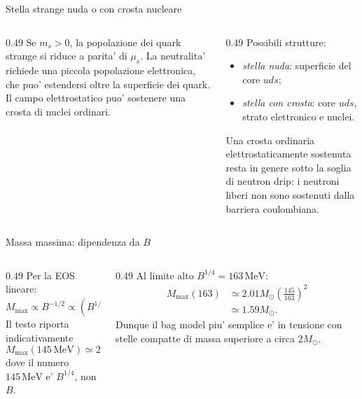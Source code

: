 \begin{frame}{Stella strange nuda o con crosta nucleare}
\small
\begin{columns}[T,onlytextwidth]
\begin{column}{0.49\textwidth}
Se $m_s>0$, la popolazione dei quark
strange si riduce a parita' di $\mu_s$.
\medskip
La neutralita' richiede una piccola
popolazione elettronica, che puo'
estendersi oltre la superficie dei quark.
\medskip
Il campo elettrostatico puo' sostenere
una crosta di nuclei ordinari.
\end{column}
\begin{column}{0.49\textwidth}
Possibili strutture:
\begin{itemize}
\item \emph{stella nuda}: superficie del core $uds$;
\item \emph{stella con crosta}: core $uds$,
strato elettronico e nuclei.
\end{itemize}
Una crosta ordinaria elettrostaticamente
sostenuta resta in genere sotto
la soglia di neutron drip: i neutroni
liberi non sono sostenuti dalla
barriera coulombiana.
\end{column}
\end{columns}
\end{frame}

\begin{frame}{Massa massima: dipendenza da $B$}
\small
\begin{columns}[T,onlytextwidth]
\begin{column}{0.49\textwidth}
Per la EOS lineare:
\[
M_{\max}\propto B^{-1/2}
\propto(B^{1/4})^{-2}.
\]
Il testo riporta indicativamente
\[
M_{\max}(145\,\mathrm{MeV})
\simeq2.01\,M_\odot,
\]
dove il numero $145\,\mathrm{MeV}$
e' $B^{1/4}$, non $B$.
\end{column}
\begin{column}{0.49\textwidth}
Al limite alto $B^{1/4}=163\,\mathrm{MeV}$:
\begin{align*}
M_{\max}(163)
&\simeq2.01M_\odot
\left(\frac{145}{163}\right)^2\\
&\simeq1.59M_\odot.
\end{align*}
Dunque il bag model piu' semplice
e' in tensione con stelle compatte
di massa superiore a circa $2M_\odot$.
\end{column}
\end{columns}
\end{frame}


